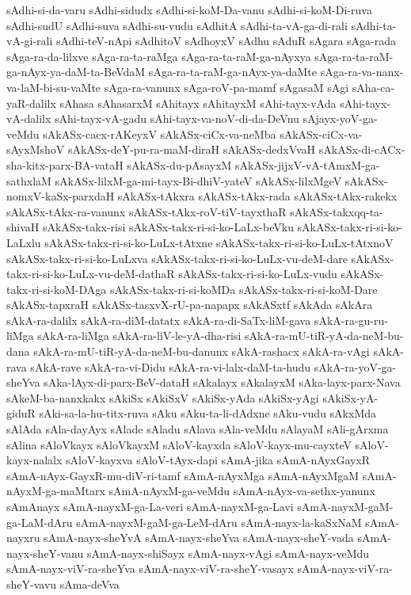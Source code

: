 {sAdhi-si-da-varu
sAdhi-sidudx
sAdhi-si-koM-Da-vanu
sAdhi-si-koM-Di-ruva
sAdhi-sudU
sAdhi-suva
sAdhi-su-vudu
sAdhitA
sAdhi-ta-vA-ga-di-rali
sAdhi-ta-vA-gi-rali
sAdhi-teV-nApi
sAdhitoV
sAdhoyxV
sAdhu
sAduR
sAgara
sAga-rada
sAga-ra-da-lilxve
sAga-ra-ta-raMga
sAga-ra-ta-raM-ga-nAyxya
sAga-ra-ta-raM-ga-nAyx-ya-daM-ta-BeVdaM
sAga-ra-ta-raM-ga-nAyx-ya-daMte
sAga-ra-va-nanx-va-laM-bi-su-vaMte
sAga-ra-vanunx
sAga-roV-pa-mamf
sAgasaM
sAgi
sAha-ca-yaR-dalilx
sAhasa
sAhasarxM
sAhitayx
sAhitayxM
sAhi-tayx-vAda
sAhi-tayx-vA-dalilx
sAhi-tayx-vA-gadu
sAhi-tayx-va-noV-di-da-DeVnu
sAjayx-yoV-ga-veMdu
sAkASx-cacx-rAKeyxV
sAkASx-ciCx-va-neMba
sAkASx-ciCx-va-sAyxMshoV
sAkASx-deY-pu-ra-maM-diraH
sAkASx-dedxVvaH
sAkASx-di-cACx-sha-kitx-parx-BA-vataH
sAkASx-du-pAsayxM
sAkASx-jijxV-vA-tAmxM-ga-sathxlaM
sAkASx-lilxM-ga-mi-tayx-Bi-dhiV-yateV
sAkASx-lilxMgeV
sAkASx-nomxV-kaSx-parxdaH
sAkASx-tAkxra
sAkASx-tAkx-rada
sAkASx-tAkx-rakekx
sAkASx-tAkx-ra-vanunx
sAkASx-tAkx-roV-tiV-tayxthaR
sAkASx-takxqq-ta-shivaH
sAkASx-takx-risi
sAkASx-takx-ri-si-ko-LaLx-beVku
sAkASx-takx-ri-si-ko-LaLxlu
sAkASx-takx-ri-si-ko-LuLx-tAtxne
sAkASx-takx-ri-si-ko-LuLx-tAtxnoV
sAkASx-takx-ri-si-ko-LuLxva
sAkASx-takx-ri-si-ko-LuLx-vu-deM-dare
sAkASx-takx-ri-si-ko-LuLx-vu-deM-dathaR
sAkASx-takx-ri-si-ko-LuLx-vudu
sAkASx-takx-ri-si-koM-DAga
sAkASx-takx-ri-si-koMDa
sAkASx-takx-ri-si-koM-Dare
sAkASx-tapxraH
sAkASx-tasxvX-rU-pa-napapx
sAkASxtf
sAkAda
sAkAra
sAkA-ra-dalilx
sAkA-ra-diM-datatx
sAkA-ra-di-SaTx-liM-gava
sAkA-ra-gu-ru-liMga
sAkA-ra-liMga
sAkA-ra-liV-le-yA-dha-risi
sAkA-ra-mU-tiR-yA-da-neM-bu-dana
sAkA-ra-mU-tiR-yA-da-neM-bu-danunx
sAkA-rashacx
sAkA-ra-vAgi
sAkA-rava
sAkA-rave
sAkA-ra-vi-Didu
sAkA-ra-vi-lalx-daM-ta-hudu
sAkA-ra-yoV-ga-sheYva
sAka-lAyx-di-parx-BeV-dataH
sAkalayx
sAkalayxM
sAka-layx-parx-Nava
sAkeM-ba-nanxkakx
sAkiSx
sAkiSxV
sAkiSx-yAda
sAkiSx-yAgi
sAkiSx-yA-giduR
sAki-sa-la-hu-titx-ruva
sAku
sAku-ta-li-dAdxne
sAku-vudu
sAkxMda
sAlAda
sAla-dayAyx
sAlade
sAladu
sAlava
sAla-veMdu
sAlayaM
sAli-gArxma
sAlina
sAloVkayx
sAloVkayxM
sAloV-kayxda
sAloV-kayx-mu-cayxteV
sAloV-kayx-nalalx
sAloV-kayxva
sAloV-tAyx-dapi
sAmA-jika
sAmA-nAyxGayxR
sAmA-nAyx-GayxR-mu-diV-ri-tamf
sAmA-nAyxMga
sAmA-nAyxMgaM
sAmA-nAyxM-ga-maMtarx
sAmA-nAyxM-ga-veMdu
sAmA-nAyx-va-sethx-yanunx
sAmAnayx
sAmA-nayxM-ga-La-veri
sAmA-nayxM-ga-Lavi
sAmA-nayxM-gaM-ga-LaM-dAru
sAmA-nayxM-gaM-ga-LeM-dAru
sAmA-nayx-la-kaSxNaM
sAmA-nayxru
sAmA-nayx-sheYvA
sAmA-nayx-sheYva
sAmA-nayx-sheY-vada
sAmA-nayx-sheY-vanu
sAmA-nayx-shiSayx
sAmA-nayx-vAgi
sAmA-nayx-veMdu
sAmA-nayx-viV-ra-sheYva
sAmA-nayx-viV-ra-sheY-vasayx
sAmA-nayx-viV-ra-sheY-vavu
sAma-deVva
}

